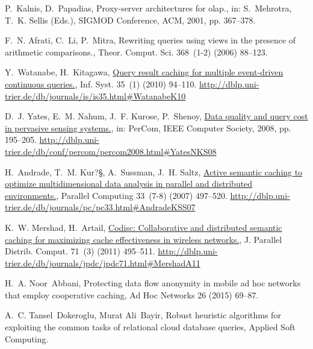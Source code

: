 \documentclass{article}
\begin{document}
\begin{thebibliography}{10}
P.~Kalnis, D.~Papadias, Proxy-server architectures for olap., in: S.~Mehrotra,
  T.~K. Sellis (Eds.), SIGMOD Conference, ACM, 2001, pp. 367--378.

F.~N. Afrati, C.~Li, P.~Mitra, Rewriting queries using views in the presence of
  arithmetic comparisons., Theor. Comput. Sci. 368~(1-2) (2006) 88--123.

Y.~Watanabe, H.~Kitagawa,
  \href{http://dblp.uni-trier.de/db/journals/is/is35.html\#WatanabeK10}{Query
  result caching for multiple event-driven continuous queries.}, Inf. Syst.
  35~(1) (2010) 94--110.
\newline\urlprefix\url{http://dblp.uni-trier.de/db/journals/is/is35.html\#WatanabeK10}

D.~J. Yates, E.~M. Nahum, J.~F. Kurose, P.~Shenoy,
  \href{http://dblp.uni-trier.de/db/conf/percom/percom2008.html\#YatesNKS08}{Data
  quality and query cost in pervasive sensing systems.}, in: PerCom, IEEE
  Computer Society, 2008, pp. 195--205.
\newline\urlprefix\url{http://dblp.uni-trier.de/db/conf/percom/percom2008.html\#YatesNKS08}

H.~Andrade, T.~M. Kur?§, A.~Sussman, J.~H. Saltz,
  \href{http://dblp.uni-trier.de/db/journals/pc/pc33.html\#AndradeKSS07}{Active
  semantic caching to optimize multidimensional data analysis in parallel and
  distributed environments.}, Parallel Computing 33~(7-8) (2007) 497--520.
\newline\urlprefix\url{http://dblp.uni-trier.de/db/journals/pc/pc33.html\#AndradeKSS07}

K.~W. Mershad, H.~Artail,
  \href{http://dblp.uni-trier.de/db/journals/jpdc/jpdc71.html\#MershadA11}{Codisc:
  Collaborative and distributed semantic caching for maximizing cache
  effectiveness in wireless networks.}, J. Parallel Distrib. Comput. 71~(3)
  (2011) 495--511.
\newline\urlprefix\url{http://dblp.uni-trier.de/db/journals/jpdc/jpdc71.html\#MershadA11}

H.~A. Noor~Abbani, Protecting data flow anonymity in mobile ad hoc networks
  that employ cooperative caching, Ad Hoc Networks 26 (2015) 69--87.

A.~C. Tansel~Dokeroglu, Murat Ali~Bayir, Robust heuristic algorithms for
  exploiting the common tasks of relational cloud database queries, Applied
  Soft Computing.


\end{thebibliography}
\end{document}
